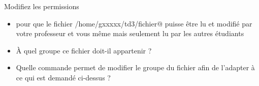 \documentclass[a4paper,11pt]{article}
\begin{document}
			
		\begin{Exercice}{ Modifiez les permissions} 
		        \begin{itemize}
				\item pour que le fichier \verb@/home/gxxxxx/td3/fichier@ puisse \^etre lu et modifi\'e par votre professeur et vous m\^eme mais seulement lu par les autres 						\'etudiants 
					\par
					 \textcolor{gray}{\underline{\hspace*{3em}}}  \textcolor{gray}{\underline{\hspace*{1em}}}  \textcolor{gray}{\underline{\hspace*{1em}}}  \textcolor{gray}	
					 {\underline{\hspace*{1em}}}  \textcolor{gray}{\underline{\hspace*{16em}}} 
				\item \`A quel groupe ce fichier doit-il appartenir ?
					\par
				 	\textcolor{gray}{\underline{\hspace*{10em}}} 
					
				\item Quelle commande permet de modifier le groupe du fichier afin de l'adapter \`a ce qui est demand\'e ci-dessus ?
					\par \textcolor{gray}{\underline{\hspace*{3em}}}  \textcolor{gray}{\underline{\hspace*{10em}}} 
			\end{itemize}
				
		\end{Exercice}	
		\clearpage
		
\end{document}
